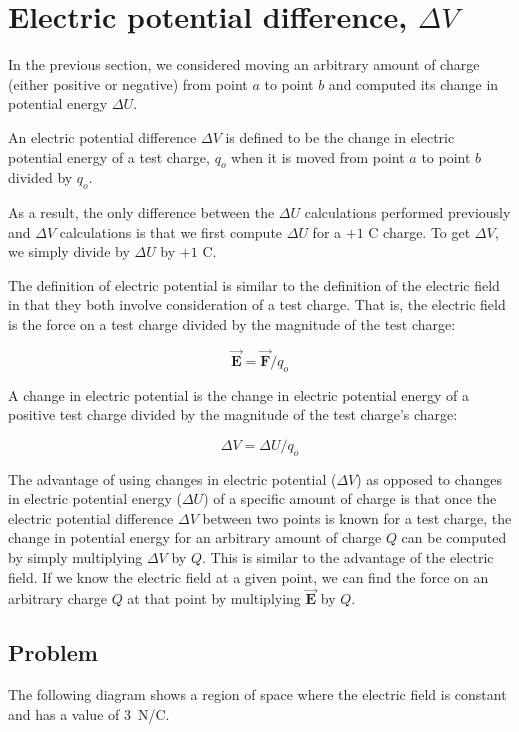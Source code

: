 \documentclass{article}
\newcommand{\bfvec}[1]{\vec{\mathbf{#1}}}
\begin{document}
\newpage

\section{Electric potential difference, $\Delta V$}

In the previous section, we considered moving an arbitrary amount of charge (either positive or negative) from point $a$ to point $b$ and computed its change in potential energy $\Delta U$.

An electric potential difference $\Delta V$ is defined to be the change in electric potential energy of a test charge, $q_o$ when it is moved from point $a$ to point $b$ divided by $q_o$.

As a result, the only difference between the $\Delta U$ calculations performed previously and $\Delta V$ calculations is that we first compute $\Delta U$ for a $+1\text{ C}$ charge. To get $\Delta V$, we simply divide by $\Delta U$ by $+1\text{ C}$.

The definition of electric potential is similar to the definition of the electric field in that they both involve consideration of a test charge. That is, the electric field is the force on a test charge divided by the magnitude of the test charge:

$$\bfvec{E} = {\bfvec{F}}/{q_o}$$

A change in electric potential is the change in electric potential energy of a positive test charge divided by the magnitude of the test charge's charge:

$$\Delta V = {\Delta U}/{q_o}$$

The advantage of using changes in electric potential ($\Delta V$) as opposed to changes in electric potential energy ($\Delta U$) of a specific amount of charge is that once the electric potential difference $\Delta V$ between two points is known for a test charge, the change in potential energy for an arbitrary amount of charge $Q$ can be computed by simply multiplying $\Delta V$ by $Q$. This is similar to the advantage of the electric field. If we know the electric field at a given point, we can find the force on an arbitrary charge $Q$ at that point by multiplying $\bfvec{E}$ by $Q$.

\newpage

\subsection{Problem}

The following diagram shows a region of space where the electric field is constant and has a value of $3$~N/C. 
\end{document}
